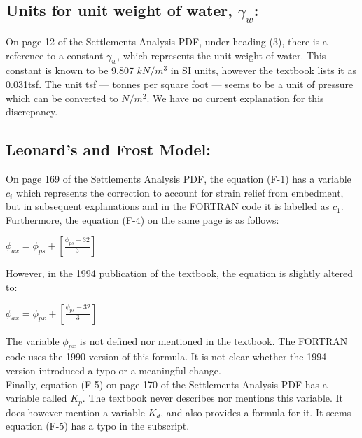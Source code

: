 \documentclass[11pt,fleqn]{article}
\newcommand{\indentpar}{\phantom{=}}
\begin{document}
    \subsection*{Units for unit weight of water, $\gamma_w$:} 
    \indentpar On page 12 of the Settlements Analysis PDF, 
    under heading (3), there is a reference to a constant $\gamma_w$, 
    which represents the unit weight of water. This constant is known
    to be 9.807 $kN/m^3$ in SI units, however the textbook lists it as 
    0.031tsf. The unit tsf — tonnes per square foot — seems to be a unit
    of pressure which can be converted to $N/m^2$. We have no current 
    explanation for this discrepancy.

    \subsection*{Leonard's and Frost Model:}
    \indentpar On page 169 of the Settlements Analysis PDF, 
    the equation (F-1) has a variable $c_i$ which represents 
    the correction to account for strain relief from embedment,
    but in subsequent explanations and in the FORTRAN code it 
    is labelled as $c_1$. \\
    \indentpar Furthermore, the equation (F-4) on the 
    same page is as follows:
    \begin{center}
        $\phi_{ax} = \phi_{ps} + [\frac{\phi_{ps} - 32}{3}]$
    \end{center}
    \indentpar However, in the 1994 publication of the textbook, the equation
    is slightly altered to:
    \begin{center}
        $\phi_{ax} = \phi_{px} + [\frac{\phi_{ps} - 32}{3}]$
    \end{center}
    \indentpar The variable $\phi_{px}$ is not defined nor mentioned in the textbook. 
    The FORTRAN code uses the 1990 version of this formula. It is not clear
    whether the 1994 version introduced a typo or a meaningful change. \\
    \indentpar Finally, equation (F-5) on page 170 of the Settlements 
    Analysis PDF has a variable called $K_p$. The textbook never describes 
    nor mentions this variable. It does however mention a variable $K_d$, and also
    provides a formula for it. It seems equation (F-5) has a typo in the subscript.
\end{document}
